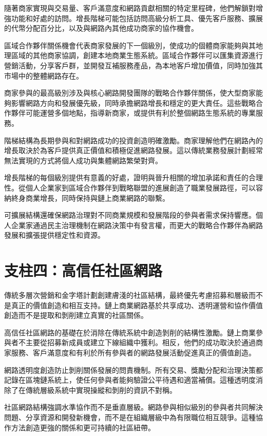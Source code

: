 \documentclass[
  Letterpaper,
]{scrbook}
\begin{document}
隨著商家實現與交易量、客戶滿意度和網路貢獻相關的特定里程碑，他們解鎖對增強功能和好處的訪問。增長階梯可能包括訪問高級分析工具、優先客戶服務、擴展的代幣分配百分比，以及與網路內其他成功商家的協作機會。

區域合作夥伴關係機會代表商家發展的下一個級別，使成功的個體商家能夠與其地理區域的其他商家協調，創建本地商業生態系統。區域合作夥伴可以匯集資源進行營銷活動，分享客戶群，並開發互補服務產品，為本地客戶增加價值，同時加強其市場中的整體網路存在。

商家參與的最高級別涉及與核心網路開發團隊的戰略合作夥伴關係，使大型商家能夠影響網路方向和發展優先級，同時承擔網路增長和穩定的更大責任。這些戰略合作夥伴可能運營多個地點，指導新商家，或提供有利於整個網路生態系統的專業服務。

階梯結構為長期參與和對網路成功的投資創造明確激勵。商家理解他們在網路內的增長取決於為客戶提供真正價值和積極促進網路發展。這以傳統業務發展計劃經常無法實現的方式將個人成功與集體網路繁榮對齊。

增長階梯的每個級別提供有意義的好處，證明與晉升相關的增加承諾和責任的合理性。從個人企業家到區域合作夥伴到戰略聯盟的進展創造了職業發展路徑，可以容納終身商業增長，同時保持與鏈上商業網路的聯繫。

可擴展結構還確保網路治理對不同商業規模和發展階段的參與者需求保持響應。個人企業家通過民主治理機制在網路決策中有發言權，而更大的戰略合作夥伴為網路發展和擴張提供穩定性和資源。

\section{支柱四：高信任社區網路}\label{ux652fux67f1ux56dbux9ad8ux4fe1ux4efbux793eux5340ux7db2ux8def}

傳統多層次營銷和金字塔計劃創建膚淺的社區結構，最終優先考慮招募和層級而不是真正的價值創造和相互支持。鏈上商業網路基於共享成功、透明運營和協作價值創造而不是提取和剝削建立真實的社區關係。

高信任社區網路的基礎在於消除在傳統系統中創造剝削的結構性激勵。鏈上商業參與者不主要從招募新成員或建立下線組織中獲利。相反，他們的成功取決於通過商家服務、客戶滿意度和有利於所有參與者的網路發展活動促進真正的價值創造。

網路透明度創造防止剝削關係發展的問責機制。所有交易、獎勵分配和治理決策都記錄在區塊鏈系統上，使任何參與者能夠驗證公平待遇和適當補償。這種透明度消除了在傳統層級系統中實現操縱和剝削的資訊不對稱。

社區網路結構強調水準協作而不是垂直層級。網路參與相似級別的參與者共同解決問題、分享資源和開發新機會，而不是在組織層級中為有限職位相互競爭。這種協作方法創造更強的關係和更可持續的社區紐帶。
\end{document}
